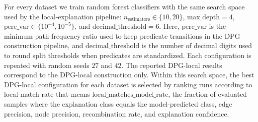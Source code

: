 \documentclass[runningheads]{llncs}
\begin{document}
For every dataset we train random forest classifiers with the same search space
used by the local-explanation pipeline:
$n_{\mathrm{estimators}} \in \{10,20\}$, $\mathrm{max\_depth}=4$,
$\mathrm{perc\_var} \in \{10^{-4},10^{-5}\}$,
and $\mathrm{decimal\_threshold}=6$.
Here, $\mathrm{perc\_var}$ is the minimum path-frequency ratio used to keep
predicate transitions in the DPG construction pipeline, and
$\mathrm{decimal\_threshold}$ is the number of decimal digits used to round split thresholds when predicates are standardized.
Each configuration is repeated with random seeds $27$ and $42$.
The reported DPG-local results correspond to the DPG-local construction only.
Within this search space, the best DPG-local configuration for each dataset is selected by ranking runs according to local match rate that means  $\mathrm{local\_matches\_model\_rate}$, the fraction of evaluated samples where the explanation class equals the model-predicted class, edge precision, node precision,
recombination rate, and explanation confidence.
\end{document}
